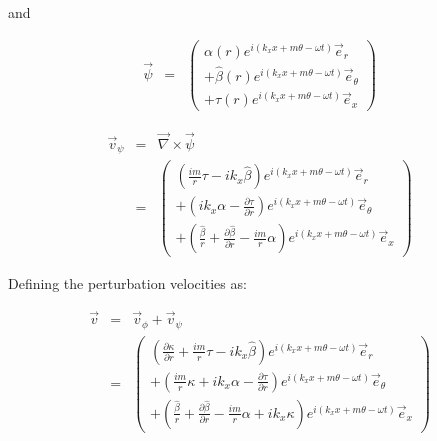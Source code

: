and

\begin{eqnarray}
\vec{\psi} &=& 
\left(
\begin{array}{r}
\alpha \left(r \right) e^{i \left(k_x x + m \theta - \omega t \right)} \vec{e}_r
\\
+
\widehat{\beta} \left(r \right) e^{i \left(k_x x + m \theta - \omega t \right)} \vec{e}_{\theta}
\\
+
\tau \left(r \right) e^{i \left(k_x x + m \theta - \omega t \right)} \vec{e}_x
\end{array}
\right)
\nonumber
\end{eqnarray}

\begin{eqnarray}
\vec{v}_{\psi}
&=&
\vec{\nabla} \times \vec{\psi}
\nonumber
\\
&=&
\left(
\begin{array}{r}
\left(
\frac{i m}{r}
\tau
-
i k_x \widehat{\beta}
\right) 
e^{i \left(k_x x + m \theta - \omega t \right)}
\vec{e}_r
\\
+\left(
i k_x \alpha
-
\frac{\partial \tau}{\partial r}
\right) 
e^{i \left(k_x x + m \theta - \omega t \right)}
\vec{e}_{\theta}
\\
+\left(
\frac{\widehat{\beta}}{r}
+\frac{\partial \widehat{\beta}}{\partial r}
-
\frac{i m}{r}
\alpha
\right) 
e^{i \left(k_x x + m \theta - \omega t \right)} 
\vec{e}_x
\end{array}
\right)
\nonumber
\end{eqnarray}

Defining the perturbation velocities as:

\begin{eqnarray}
\vec{v} &=& 
\vec{v}_{\phi}
+\vec{v}_{\psi}
\nonumber
\\
&=&
\left(
\begin{array}{r}
\left(
\frac{\partial \kappa}{\partial r}
+
\frac{i m}{r}
\tau
-
i k_x \widehat{\beta}
\right) 
e^{i \left(k_x x + m \theta - \omega t \right)}
\vec{e}_r
\\
+
\left(
\frac{i m}{r} \kappa
+
i k_x \alpha
-
\frac{\partial \tau}{\partial r}
\right) 
e^{i \left(k_x x + m \theta - \omega t \right)}
\vec{e}_{\theta}
\\
+
\left(
\frac{\widehat{\beta}}{r}
+\frac{\partial \widehat{\beta}}{\partial r}
-
\frac{i m}{r}
\alpha
+ i k_x \kappa
\right) 
e^{i \left(k_x x + m \theta - \omega t \right)} 
\vec{e}_x
\end{array}
\right)
\nonumber
\end{eqnarray}

